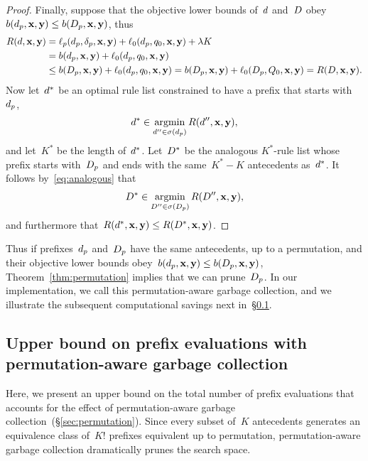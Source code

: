\begin{proof}
Finally, suppose that the objective lower bounds of~${d}$ and~${D}$
obey ${b(d_p, \mathbf{x}, \mathbf{y}) \le b(D_p, \mathbf{x}, \mathbf{y})}$, thus
\begin{align}
\Obj(\RL, \x, \y)
&= \Loss_p(\Prefix, \Labels, \x, \y) + \Loss_0(\Prefix, \Default, \x, \y) + \Reg K \nn \\
&= b(\Prefix, \x, \y) + \Loss_0(\Prefix, \Default, \x, \y) \nn \\
&\le b(\PrefixB, \x, \y) + \Loss_0(\Prefix, \Default, \x, \y)
= b(\PrefixB, \x, \y) + \Loss_0(\PrefixB, \DefaultB, \x, \y)
= \Obj(\RLB, \x, \y).
\end{align}
Now let~${d}^*$ be an optimal rule list constrained to have
a prefix that starts with~$d_p$,
\begin{align}
\RL^* \in \argmin_{\RL'' \in \StartsWith(\Prefix)} \Obj(\RL'', \x, \y),
\end{align}
and let~$K^*$ be the length of~${d}^*$.
%
Let~${D}^*$ be the analogous $K^*$-rule list whose prefix starts
with~$D_p$ and ends with the same~${K^* - K}$ antecedents as~${d}^*$.
%
It follows by~\eqref{eq:analogous} that
\begin{align}
\RLB^* \in \argmin_{\RLB'' \in \StartsWith(\PrefixB)} \Obj(\RLB'', \x, \y),
\end{align}
and furthermore that~${R({d}^*, \mathbf{x}, \mathbf{y}) \le R({D}^*, \mathbf{x}, \mathbf{y})}$.
\end{proof}

Thus if prefixes~$d_p$ and~$D_p$ have the same antecedents,
up to a permutation, and their objective lower bounds
obey~${b(d_p, \mathbf{x}, \mathbf{y}) \le b(D_p, \mathbf{x}, \mathbf{y})}$,
Theorem~\ref{thm:permutation} implies that we can prune~$D_p$.
%
In our implementation, we call this permutation-aware
garbage collection, and we illustrate the subsequent
computational savings next in~\S\ref{sec:permutation-counting}.

\subsection{Upper bound on prefix evaluations with permutation-aware garbage collection}
\label{sec:permutation-counting}

Here, we present an upper bound on the total number of prefix
evaluations that accounts for the effect of permutation-aware
garbage collection~(\S\ref{sec:permutation}).
%
Since every subset of~$K$ antecedents generates an equivalence
class of~$K!$ prefixes equivalent up to permutation, permutation-aware
garbage collection dramatically prunes the search space.

